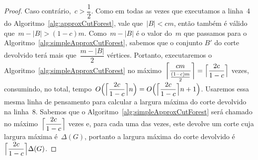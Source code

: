 \begin{proof}
	Caso contrário,~${c>\dfrac{1}{2}}$. Como em todas as vezes que
	executamos a linha~4 do Algoritmo~\ref{alg:approxCutForest}, 
	vale que~${|B|<cm}$, então também é válido que~${m-|B|>(1-c)m}$.
	Como~${m-|B|}$ é o valor do~$m$ que passamos para o 
	Algoritmo~\ref{alg:simpleApproxCutForest}, sabemos que o 
	conjunto $B'$ do corte devolvido terá mais 
	que~${\dfrac{m-|B|}{2}}$ vértices.
	Portanto, executaremos o 
	Algoritmo~\ref{alg:simpleApproxCutForest} no 
	máximo~${\ceil[\bigg]{\dfrac{cm}{\frac{(1-c)m}{2}}} 
	=\ceil[\Big]{\dfrac{2c}{1-c}}}$ vezes, consumindo, no total,
	tempo~$O\Big(\ceil[\Big]{ \dfrac{2c}{1-c}} n\Big) = O\Big(\ceil[\Big]{ \dfrac{2c}{1-c}} n+1\Big)$.
	Usaremos essa mesma linha de pensamento para calcular a largura
	máxima do corte devolvido na linha~8. 
	Sabemos que o 
	Algoritmo~\ref{alg:simpleApproxCutForest} será 
	chamado no máximo~${\ceil[\Big]{\dfrac{2c}{1-c}}}$ 
	vezes e, para cada uma 
	das vezes, este devolve um corte cuja largura 
	máxima é~$\Delta(G)$, portanto a largura máxima do corte 
	devolvido é~${\ceil[\Big]{\dfrac{2c}{1-c}}\Delta(G)}$.
	\end{proof}




